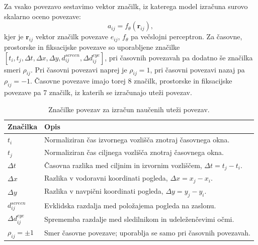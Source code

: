 
Za vsako povezavo sestavimo vektor značilk, iz katerega model izračuna surovo skalarno oceno povezave:
\begin{equation}
    a_{ij}=f_{\theta}(\mathbf{r}_{ij}),
\end{equation}
kjer je $\mathbf{r}_{ij}$ vektor značilk povezave $e_{ij}$, $f_{\theta}$ pa večslojni perceptron.
Za časovne, prostorske in fiksacijske povezave so uporabljene značilke $[t_i, t_j, \Delta t, \Delta x, \Delta y, d_{ij}^{screen}, \Delta d^{eye}_{ij}]$, pri časovnih povezavah pa dodatno še značilka smeri $\rho_{ij}$.
Pri časovni povezavi naprej je $\rho_{ij}=1$, pri časovni povezavi nazaj pa $\rho_{ij}=-1$.
Časovne povezave imajo torej 8 značilk, prostorske in fiksacijske povezave pa 7 značilk, iz katerih se izračunajo uteži povezav.
  
\begin{table}[H]
    \centering
    \caption{Značilke povezav za izračun naučenih uteži povezav.}
    \label{tab:znacilke-povezav}
    \begin{tabularx}{\textwidth}{@{}>{\raggedright\arraybackslash}p{} >{\raggedright\arraybackslash}X@{}}
        \toprule
        Značilka & Opis \\
        \midrule
        $t_i$ & Normaliziran čas izvornega vozlišča znotraj časovnega okna. \\
        $t_j$ & Normaliziran čas ciljnega vozlišča znotraj časovnega okna. \\
        $\Delta t$ & Časovna razlika med ciljnim in izvornim vozliščem, $\Delta t = t_j - t_i$. \\
        $\Delta x$ & Razlika v vodoravni koordinati pogleda, $\Delta x = x_j - x_i$. \\
        $\Delta y$ & Razlika v navpični koordinati pogleda, $\Delta y = y_j - y_i$. \\
        $d_{ij}^{screen}$ & Evklidska razdalja med položajema pogleda na zaslonu. \\
        $\Delta d^{eye}_{ij}$ & Sprememba razdalje med sledilnikom in udeleženčevimi očmi. \\
        $\rho_{ij} = \pm 1$ & Smer časovne povezave; uporablja se samo pri časovnih povezavah. \\
        \bottomrule
    \end{tabularx}
\end{table}


